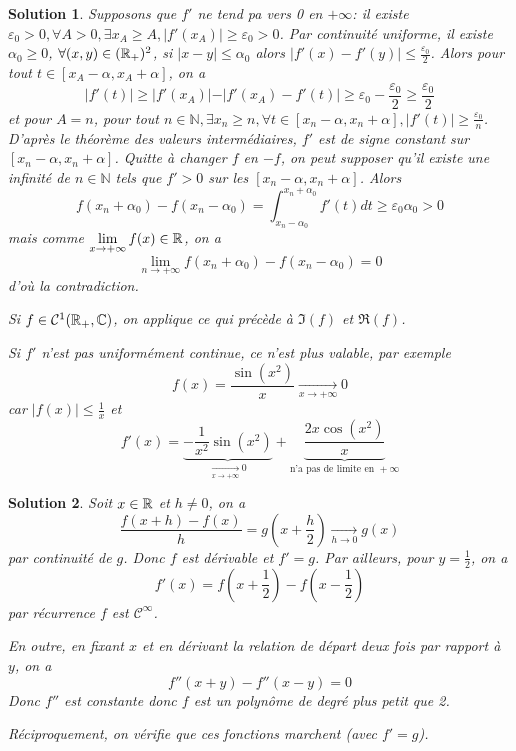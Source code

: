 \documentclass[12pt]{article}
\newtheorem{solution}{Solution}[section]
\theoremstyle{remark}
\newcommand{\C}{\mathbb{C}} \newcommand{\Q}{\mathbb{Q}}
\newcommand{\N}{\mathbb{N}} \newcommand{\Z}{\mathbb{Z}}
\numberwithin{equation}{section}
\begin{document}
\begin{solution}
	Supposons que $f'$ ne tend pa vers 0 en $+\infty$: il existe $\varepsilon_{0}>0,\forall A>0,\exists x_{A}\geqslant A,\vert f'(x_{A})\vert\geqslant\varepsilon_{0}>0$. Par continuité uniforme, il existe $\alpha_{0}\geqslant0$, $\forall(x,y)\in(\mathbb{R}_{+})^{2}$, si $\vert x-y\vert\leqslant\alpha_{0}$ alors $\vert f'(x)-f'(y)\vert\leqslant\frac{\varepsilon_{0}}{2}$. Alors pour tout $t\in[x_{A}-\alpha,x_{A}+\alpha]$, on a 
	$$\vert f'(t)\vert\geqslant \vert f'(x_{A})\vert-\vert f'(x_{A})-f'(t)\vert\geqslant\varepsilon_{0}-\frac{\varepsilon_{0}}{2}\geqslant\frac{\varepsilon_{0}}{2}$$
	et pour $A=n$, pour tout $n\in\N,\exists x_{n}\geqslant n,\forall t\in[x_{n}-\alpha,x_{n}+\alpha],\vert f'(t)\vert\geqslant\frac{\varepsilon_{0}}{n}$. D'après le théorème des valeurs intermédiaires, $f'$ est de signe constant sur $[x_{n}-\alpha,x_{n}+\alpha]$. Quitte à changer $f$ en $-f$, on peut supposer qu'il existe une infinité de $n\in\N$ tels que $f'>0$ sur les $[x_{n}-\alpha,x_{n}+\alpha]$. Alors
	$$f(x_{n}+\alpha_{0})-f(x_{n}-\alpha_{0})=\int_{x_{n}-\alpha_{0}}^{x_{n}+\alpha_{0}}f'(t)dt\geqslant\varepsilon_{0}\alpha_{0}>0$$
	mais comme $\lim\limits_{x\to+\infty}f(x)\in\mathbb{R}$, on a 
	$$\lim\limits_{n\to+\infty}f(x_{n}+\alpha_{0})-f(x_{n}-\alpha_{0})=0$$
	d'où la contradiction.

	Si $f\in\mathcal{C}^{1}(\R_{+},\C)$, on applique ce qui précède à $\Im(f)$ et $\Re(f)$. 

	Si $f'$ n'est pas uniformément continue, ce n'est plus valable, par exemple 
	$$f(x)=\frac{\sin(x^{2})}{x}\xrightarrow[x\to+\infty]{}0$$
	car $\vert f(x)\vert\leqslant\frac{1}{x}$ et 
	$$f'(x)=\underbrace{-\frac{1}{x^{2}}\sin(x^{2})}_{\xrightarrow[x\to+\infty]{}0}+\underbrace{\frac{2x\cos(x^{2})}{x}}_{\text{n'a pas de limite en }+\infty}$$
\end{solution}

\begin{solution}
	Soit $x\in\mathbb{R}$ et $h\neq0$, on a 
	$$\frac{f(x+h)-f(x)}{h}=g(x+\frac{h}{2})\xrightarrow[h\to0]{}g(x)$$
	par continuité de $g$. Donc $f$ est dérivable et $f'=g$. Par ailleurs, pour $y=\frac{1}{2}$, on a 
	$$f'(x)=f(x+\frac{1}{2})-f(x-\frac{1}{2})$$
	par récurrence $f$ est $\mathcal{C}^{\infty}$.

	En outre, en fixant $x$ et en dérivant la relation de départ deux fois par rapport à $y$, on a 
	$$f''(x+y)-f''(x-y)=0$$
	Donc $f''$ est constante donc $f$ est un polynôme de degré plus petit que 2.

	Réciproquement, on vérifie que ces fonctions marchent (avec $f'=g$).
\end{solution}
\end{document}
